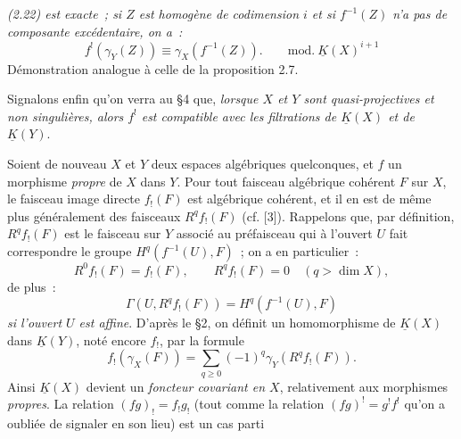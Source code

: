 \emph{(2.22) est exacte~; si $Z$ est homogène de codimension $i$ et si $f^{-1}(Z)$ n'a pas de composante excédentaire, on a~:}
\begin{equation}\tag{2.23}
 f^!(\gamma_Y(Z))\equiv\gamma_X(f^{-1}(Z)).\qquad\mathrm{mod.}\ \underline K(X)^{i+1}
\end{equation}
Démonstration analogue à celle de la proposition 2.7.

Signalons enfin qu'on verra au \S 4 que, \emph{lorsque $X$ et $Y$ sont quasi-projectives et non singulières, alors $f^!$ est compatible avec les filtrations de $\underline K(X)$ et de $\underline K(Y)$}.

Soient de nouveau $X$ et $Y$ deux espaces algébriques quelconques, et $f$ un morphisme \emph{propre} de $X$ dans $Y$. Pour tout faisceau algébrique cohérent $F$ sur $X$, le faisceau image directe $f_!(F)$ est algébrique cohérent, et il en est de même plus généralement des faisceaux $R^qf_!(F)$ (cf. [3]). Rappelons que, par définition, $R^qf_!(F)$ est le faisceau sur $Y$ associé au préfaisceau qui à l'ouvert $U$ fait correspondre le groupe $H^q(f^{-1}(U),F)$~; on a en particulier~:
\begin{equation}\tag{2.24}
 R^0f_!(F)=f_!(F),\qquad R^qf_!(F)=0\quad(q>\dim X),
\end{equation}
de plus~:
\begin{equation}\tag{2.25}
 \Gamma(U,R^qf_!(F))=H^q(f^{-1}(U),F)
\end{equation}
\emph{si l'ouvert $U$ est affine}. D'après le \S 2, on définit un homomorphisme de $\underline K(X)$ dans $\underline K(Y)$, noté encore $f_!$, par la formule
\begin{equation}\tag{2.26}
 f_!(\gamma_X(F))=\sum_{q\geq0}(-1)^q\gamma_Y(R^qf_!(F)).
\end{equation}
Ainsi $\underline K(X)$ devient un \emph{foncteur covariant en $X$}, relativement aux morphismes \emph{propres}. La relation $(fg)_!=f_!g_!$ (tout comme la relation $(fg)^!=g^!f^!$ qu'on a oubliée de signaler en son lieu) est un cas
parti%
